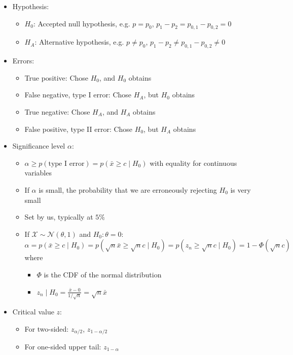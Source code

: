 \begin{itemize}
    \item Hypothesis:
    \begin{itemize}
        \item $H_0$: Accepted null hypothesis, e.g. $p=p_0$, $p_1-p_2=p_{0,1}-p_{0,2}=0$
        \item $H_A$: Alternative hypothesis, e.g. $p \neq p_0$, $p_1-p_2 \neq p_{0,1}-p_{0,2} \neq 0$
    \end{itemize}
    \item Errors:
    \begin{itemize}
        \item True positive: Chose $H_0$, and $H_0$ obtains
        \item False negative, type I error: Chose $H_A$, but $H_0$ obtains
        \item True negative: Chose $H_A$, and $H_A$ obtains
        \item False positive, type II error: Chose $H_0$, but $H_A$ obtains
    \end{itemize}
    \item Significance level $\alpha$: 
    \begin{itemize}
        \item $\alpha \geq p(\textrm{type I error}) = p(\bar{x} \geq c \mid H_0)$ with equality for continuous variables 
        \item If $\alpha$ is small, the probability that we are erroneously rejecting $H_0$ is very small
        \item Set by us, typically at $5\%$
        \item If $\mathcal{X} \sim \mathcal{N}(\theta,1)$ and $H_0: \theta = 0$:
        $\alpha = p(\bar{x} \geq c \mid H_0) = p(\sqrt{n}\bar{x} \geq \sqrt{n}c \mid H_0) = p(z_n \geq \sqrt{n}c \mid H_0) = 1-\Phi(\sqrt{n}c)$ 
        where 
        \begin{itemize}
            \item $\Phi$ is the CDF of the normal distribution 
            \item $z_n \mid H_0 = \frac{\bar{x}-0}{1/\sqrt{n}} = \sqrt{n}\bar{x}$
        \end{itemize}
    \end{itemize}
    \item Critical value $z$: 
    \begin{itemize}
        \item For two-sided: $z_{\alpha/2}$, $z_{1 - \alpha/2}$
        \item For one-sided upper tail: $z_{1 - \alpha}$

\end{itemize}
\end{itemize}
